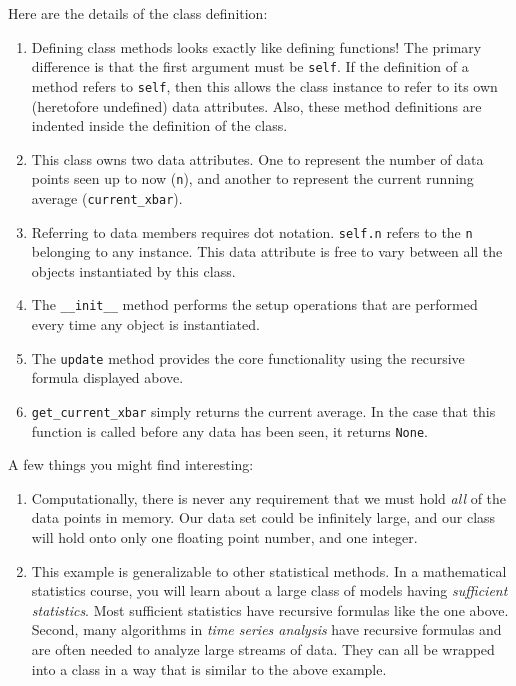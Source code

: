 \documentclass[
  12pt,
]{krantz}
\begin{document}
Here are the details of the class definition:

\begin{enumerate}
\def\labelenumi{\arabic{enumi}.}
\item
  Defining class methods looks exactly like defining functions! The primary difference is that the first argument must be \texttt{self}. If the definition of a method refers to \texttt{self}, then this allows the class instance to refer to its own (heretofore undefined) data attributes. Also, these method definitions are indented inside the definition of the class.
\item
  This class owns two data attributes. One to represent the number of data points seen up to now (\texttt{n}), and another to represent the current running average (\texttt{current\_xbar}).
\item
  Referring to data members requires dot notation. \texttt{self.n} refers to the \texttt{n} belonging to any instance. This data attribute is free to vary between all the objects instantiated by this class.
\item
  The \texttt{\_\_init\_\_} method performs the setup operations that are performed every time any object is instantiated.
\item
  The \texttt{update} method provides the core functionality using the recursive formula displayed above.
\item
  \texttt{get\_current\_xbar} simply returns the current average. In the case that this function is called before any data has been seen, it returns \texttt{None}.
\end{enumerate}

A few things you might find interesting:

\begin{enumerate}
\def\labelenumi{\roman{enumi}.}
\item
  Computationally, there is never any requirement that we must hold \emph{all} of the data points in memory. Our data set could be infinitely large, and our class will hold onto only one floating point number, and one integer.
\item
  This example is generalizable to other statistical methods. In a mathematical statistics course, you will learn about a large class of models having \emph{sufficient statistics}. Most sufficient statistics have recursive formulas like the one above. Second, many algorithms in \emph{time series analysis} have recursive formulas and are often needed to analyze large streams of data. They can all be wrapped into a class in a way that is similar to the above example.
\end{enumerate}
\end{document}
